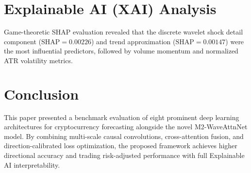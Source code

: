 \documentclass[journal]{IEEEtran}
\begin{document}
\section{Explainable AI (XAI) Analysis}
Game-theoretic SHAP evaluation revealed that the discrete wavelet shock detail component ($\text{SHAP}=0.00226$) and trend approximation ($\text{SHAP}=0.00147$) were the most influential predictors, followed by volume momentum and normalized ATR volatility metrics.

\section{Conclusion}
This paper presented a benchmark evaluation of eight prominent deep learning architectures for cryptocurrency forecasting alongside the novel M2-WaveAttnNet model. By combining multi-scale causal convolutions, cross-attention fusion, and direction-calibrated loss optimization, the proposed framework achieves higher directional accuracy and trading risk-adjusted performance with full Explainable AI interpretability.



\end{document}
